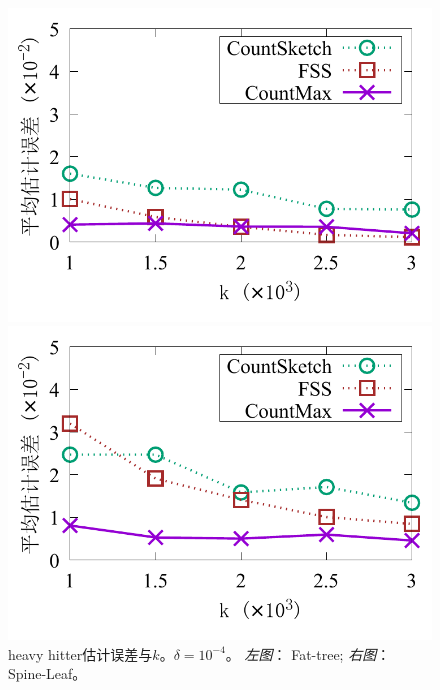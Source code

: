 \begin{figure}[ht]
	\centering
	\begin{minipage}[t]{0.49\linewidth}
		\centering
		\includegraphics[width=\linewidth]{fig/ft_k_hh_10000.pdf}
	\end{minipage}\vspace{-0.6em}%
	\begin{minipage}[t]{0.49\linewidth}
		\centering
		\includegraphics[width=\linewidth]{fig/hy_k_hh_10000.pdf}
	\end{minipage}\vspace{-0.6em}%
	\caption{\textnormal{heavy hitter估计误差与$k$。$\delta=10^{-4}$。 \textit{左图}： Fat-tree; \textit{右图}： Spine-Leaf。}}
	\label{fig:hh,k,10000}
\end{figure}

